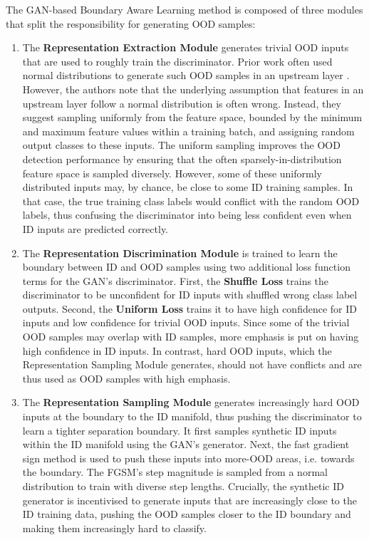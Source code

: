 \newpar The GAN-based Boundary Aware Learning method is composed of three modules that split the responsibility for generating OOD samples:
\begin{enumerate}
    \item The \textbf{Representation Extraction Module} generates trivial OOD inputs that are used to roughly train the discriminator. Prior work often used normal distributions to generate such OOD samples in an upstream layer \cite[e.g.][]{distance-confidence-2017, ood-adversarial-detection-2018}. However, the authors note that the underlying assumption that features in an upstream layer follow a normal distribution is often wrong. Instead, they suggest sampling uniformly from the feature space, bounded by the minimum and maximum feature values within a training batch, and assigning random output classes to these inputs. The uniform sampling improves the OOD detection performance by ensuring that the often sparsely-in-distribution feature space is sampled diversely. However, some of these uniformly distributed inputs may, by chance, be close to some ID training samples. In that case, the true training class labels would conflict with the random OOD labels, thus confusing the discriminator into being less confident even when ID inputs are predicted correctly.
    \item The \textbf{Representation Discrimination Module} is trained to learn the boundary between ID and OOD samples using two additional loss function terms for the GAN's discriminator. First, the \textbf{Shuffle Loss} trains the discriminator to be unconfident for ID inputs with shuffled wrong class label outputs. Second, the \textbf{Uniform Loss} trains it to have high confidence for ID inputs and low confidence for trivial OOD inputs. Since some of the trivial OOD samples may overlap with ID samples, more emphasis is put on having high confidence in ID inputs. In contrast, hard OOD inputs, which the Representation Sampling Module generates, should not have conflicts and are thus used as OOD samples with high emphasis.
    \item The \textbf{Representation Sampling Module} generates increasingly hard OOD inputs at the boundary to the ID manifold, thus pushing the discriminator to learn a tighter separation boundary. It first samples synthetic ID inputs within the ID manifold using the GAN's generator. Next, the fast gradient sign method \cite{fast-gradient-2014} is used to push these inputs into more-OOD areas, i.e. towards the boundary. The FGSM's step magnitude is sampled from a normal distribution to train with diverse step lengths. Crucially, the synthetic ID generator is incentivised to generate inputs that are increasingly close to the ID training data, pushing the OOD samples closer to the ID boundary and making them increasingly hard to classify.
\end{enumerate}

